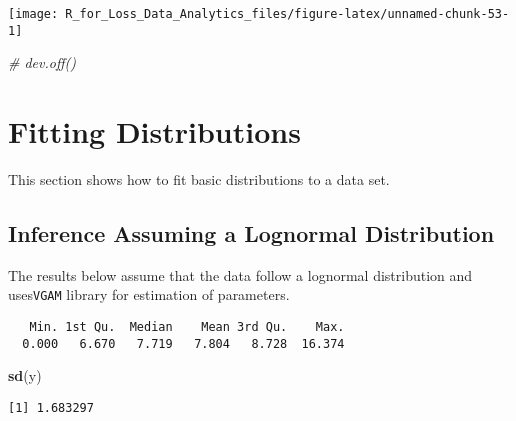 \documentclass[]{book}
\newenvironment{Shaded}{\begin{snugshade}}{\end{snugshade}}
\newcommand{\KeywordTok}[1]{\textcolor[rgb]{0.13,0.29,0.53}{\textbf{#1}}}
\newcommand{\StringTok}[1]{\textcolor[rgb]{0.31,0.60,0.02}{#1}}
\newcommand{\CommentTok}[1]{\textcolor[rgb]{0.56,0.35,0.01}{\textit{#1}}}
\newcommand{\OperatorTok}[1]{\textcolor[rgb]{0.81,0.36,0.00}{\textbf{#1}}}
\newcommand{\NormalTok}[1]{#1}
\theoremstyle{definition}
\theoremstyle{definition}
\theoremstyle{definition}
\theoremstyle{remark}
\begin{document}
\begin{center}\texttt{[image: R\_for\_Loss\_Data\_Analytics\_files/figure-latex/unnamed-chunk-53-1]} \end{center}

\begin{Shaded}
\begin{Highlighting}[]
\CommentTok{# dev.off()}
\end{Highlighting}
\end{Shaded}

\section{Fitting Distributions}\label{fitting-distributions}

This section shows how to fit basic distributions to a data set.

\subsection{Inference Assuming a Lognormal
Distribution}\label{inference-assuming-a-lognormal-distribution}

The results below assume that the data follow a lognormal distribution
and uses\texttt{VGAM} library for estimation of parameters.

\begin{Shaded}
\end{Shaded}

\begin{verbatim}
   Min. 1st Qu.  Median    Mean 3rd Qu.    Max. 
  0.000   6.670   7.719   7.804   8.728  16.374 
\end{verbatim}

\begin{Shaded}
\begin{Highlighting}[]
\KeywordTok{sd}\NormalTok{(y)}
\end{Highlighting}
\end{Shaded}

\begin{verbatim}
[1] 1.683297
\end{verbatim}
\end{document}
